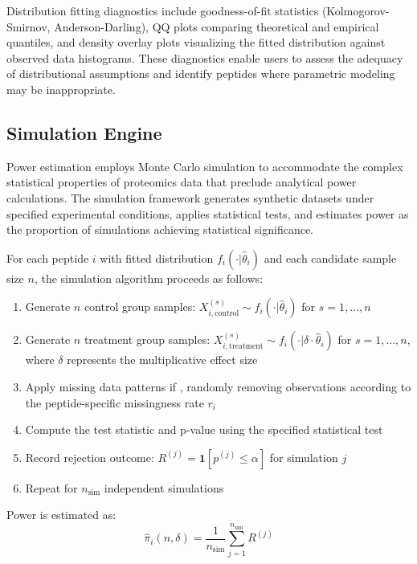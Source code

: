 \documentclass[article]{jss}
\begin{document}
Distribution fitting diagnostics include goodness-of-fit statistics (Kolmogorov-Smirnov, Anderson-Darling), QQ plots comparing theoretical and empirical quantiles, and density overlay plots visualizing the fitted distribution against observed data histograms. These diagnostics enable users to assess the adequacy of distributional assumptions and identify peptides where parametric modeling may be inappropriate.

\subsection{Simulation Engine}

Power estimation employs Monte Carlo simulation to accommodate the complex statistical properties of proteomics data that preclude analytical power calculations. The simulation framework generates synthetic datasets under specified experimental conditions, applies statistical tests, and estimates power as the proportion of simulations achieving statistical significance.

For each peptide $i$ with fitted distribution $f_i(\cdot | \hat{\theta}_i)$ and each candidate sample size $n$, the simulation algorithm proceeds as follows:

\begin{enumerate}
\item Generate $n$ control group samples: $X_{i,\text{control}}^{(s)} \sim f_i(\cdot | \hat{\theta}_i)$ for $s = 1, \ldots, n$
\item Generate $n$ treatment group samples: $X_{i,\text{treatment}}^{(s)} \sim f_i(\cdot | \delta \cdot \hat{\theta}_i)$ for $s = 1, \ldots, n$, where $\delta$ represents the multiplicative effect size
\item Apply missing data patterns if , randomly removing observations according to the peptide-specific missingness rate $r_i$
\item Compute the test statistic and p-value using the specified statistical test
\item Record rejection outcome: $R^{(j)} = \mathbf{1}[p^{(j)} \leq \alpha]$ for simulation $j$
\item Repeat for $n_{\text{sim}}$ independent simulations
\end{enumerate}

Power is estimated as:
\begin{equation}
\hat{\pi}_i(n, \delta) = \frac{1}{n_{\text{sim}}} \sum_{j=1}^{n_{\text{sim}}} R^{(j)}
\end{equation}
\end{document}

